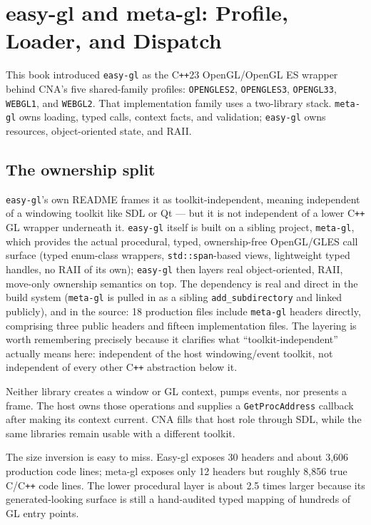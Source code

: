 \chapter{easy-gl and meta-gl: Profile, Loader, and Dispatch}
\label{ch:easygl-metagl}
\label{ch:easygl-deep-dive}

This book introduced \texttt{easy-gl} as the C\texttt{++}23 OpenGL/OpenGL ES wrapper behind
CNA's five shared-family profiles: \texttt{OPENGLES2}, \texttt{OPENGLES3},
\texttt{OPENGL33}, \texttt{WEBGL1}, and \texttt{WEBGL2}. That implementation family uses a
two-library stack. \texttt{meta-gl} owns loading, typed calls, context facts, and validation;
\texttt{easy-gl} owns resources, object-oriented state, and RAII.

\section{The ownership split}

\texttt{easy-gl}'s own README frames it as toolkit-independent, meaning independent of a
windowing toolkit like SDL or Qt --- but it is not independent of a lower C\texttt{++} GL
wrapper underneath it. \texttt{easy-gl} itself is built on a sibling project,
\texttt{meta-gl}, which provides the actual procedural, typed, ownership-free OpenGL/GLES
call surface (typed enum-class wrappers, \texttt{std::span}-based views, lightweight typed
handles, no RAII of its own); \texttt{easy-gl} then layers real object-oriented, RAII,
move-only ownership semantics on top. The dependency is real and direct in the build system
(\texttt{meta-gl} is pulled in as a sibling \texttt{add\_subdirectory} and linked publicly),
and in the source: 18 production files include \texttt{meta-gl} headers directly, comprising
three public headers and fifteen implementation files. The layering is worth remembering
precisely because it clarifies what
``toolkit-independent'' actually means here: independent of the host windowing/event toolkit,
not independent of every other C\texttt{++} abstraction below it.

Neither library creates a window or GL context, pumps events, nor presents a frame. The host
owns those operations and supplies a \texttt{GetProcAddress} callback after making its context
current. CNA fills that host role through SDL, while the same libraries remain usable with a
different toolkit.

The size inversion is easy to miss. Easy-gl exposes 30 headers and about 3{,}606 production
code lines; meta-gl exposes only 12 headers but roughly 8{,}856 true C/C\texttt{++} code lines.
The lower procedural layer is about 2.5 times larger because its generated-looking surface is
still a hand-audited typed mapping of hundreds of GL entry points.

